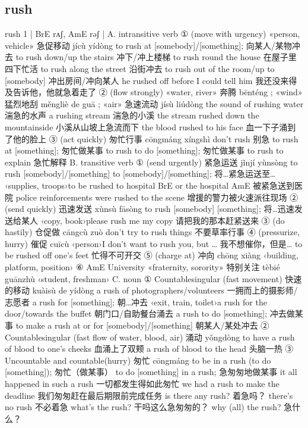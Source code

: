 \documentclass[11pt]{ctexart}
\begin{document}
{{{{\subsection{rush}
\label{sec:orgcaf6b99}
rush
1 | BrE rʌʃ, AmE rəʃ |
A. intransitive verb
① (move with urgency) «person, vehicle» 急促移动 jícù yídòng to rush at [somebody]/[something]; 向某人/某物冲去 to rush down/up the stairs 冲下/冲上楼梯 to rush round the house 在屋子里四下忙活 to rush along the street 沿街冲去 to rush out of the room/up to [somebody] 冲出房间/冲向某人 he rushed off before I could tell him 我还没来得及告诉他，他就急着走了
② (flow strongly) «water, river» 奔腾 bēnténg ; «wind» 猛烈地刮 měngliè de guā ; «air» 急速流动 jísù liúdòng the sound of rushing water 湍急的水声 a rushing stream 湍急的小溪 the stream rushed down the mountainside 小溪从山坡上急流而下 the blood rushed to his face 血一下子涌到了他的脸上
③ (act quickly) 匆忙行事 cōngmáng xíngshì don't rush 别急 to rush at [something]; 匆忙做某事 to rush to do [something]; 匆忙做某事 to rush to explain 急忙解释
B. transitive verb
① (send urgently) 紧急运送 jǐnjí yùnsòng to rush [somebody]/[something] to [somebody]/[something]; 将…紧急运送至… ‹supplies, troops›to be rushed to hospital BrE or the hospital AmE 被紧急送到医院 police reinforcements were rushed to the scene 增援的警力被火速派往现场
② (send quickly) 迅速发送 xùnsù fāsòng to rush [somebody] [something]; 将…迅速发送给某人 ‹copy, book›please rush me my copy 请把我的那本赶紧送来
③ (do hastily) 仓促做 cāngcù zuò don't try to rush things 不要草率行事
④ (pressurize, hurry) 催促 cuīcù ‹person›I don't want to rush you, but … 我不想催你，但是… to be rushed off one's feet 忙得不可开交
⑤ (charge at) 冲向 chōng xiàng ‹building, platform, position›
⑥ AmE University «fraternity, sorority» 特别关注 tèbié guānzhù ‹student, freshman›
C. noun
① Countablesingular (fast movement) 快速的移动 kuàisù de yídòng a rush of photographers/volunteers 一拥而上的摄影师/志愿者 a rush for [something]; 朝…冲去 ‹exit, train, toilet›a rush for the door/towards the buffet 朝门口/自助餐台涌去 a rush to do [something]; 冲去做某事 to make a rush at or for [somebody]/[something] 朝某人/某处冲去
② Countablesingular (fast flow of water, blood, air) 涌动 yǒngdòng to have a rush of blood to one's cheeks 血涌上了双颊 a rush of blood to the head 头脑一热
③ Uncountable and countable(hurry) 匆忙 cōngmáng to be in a rush (to do [something]); 匆忙（做某事） to do [something] in a rush; 急匆匆地做某事 it all happened in such a rush 一切都发生得如此匆忙 we had a rush to make the deadline 我们匆匆赶在最后期限前完成任务 is there any rush? 着急吗？ there's no rush 不必着急 what's the rush? 干吗这么急匆匆的？ why (all) the rush? 急什么？
}}}}
\end{document}
